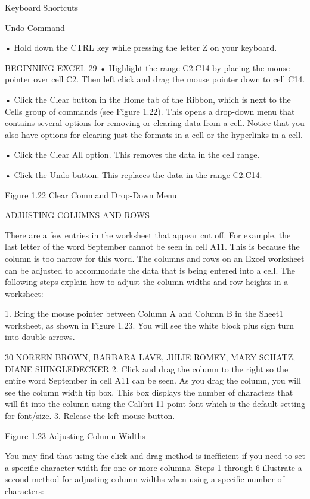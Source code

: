 Keyboard Shortcuts


Undo Command

• Hold down the CTRL key while pressing the letter Z on your keyboard.



BEGINNING EXCEL 29
• Highlight the range C2:C14 by placing the mouse pointer over cell C2. Then left click and drag the mouse
pointer down to cell C14.

• Click the Clear button in the Home tab of the Ribbon, which is next to the Cells group of commands
(see Figure 1.22). This opens a drop-down menu that contains several options for removing or clearing data
from a cell. Notice that you also have options for clearing just the formats in a cell or the hyperlinks in a cell.

• Click the Clear All option. This removes the data in the cell range.

• Click the Undo button. This replaces the data in the range C2:C14.




Figure 1.22 Clear Command Drop-Down Menu


ADJUSTING COLUMNS AND ROWS

There are a few entries in the worksheet that appear cut off. For example, the last letter of the
word September cannot be seen in cell A11. This is because the column is too narrow for this word.
The columns and rows on an Excel worksheet can be adjusted to accommodate the data that is being
entered into a cell. The following steps explain how to adjust the column widths and row heights in a
worksheet:

1. Bring the mouse pointer between Column A and Column B in the Sheet1 worksheet, as shown
in Figure 1.23. You will see the white block plus sign turn into double arrows.

30 NOREEN BROWN, BARBARA LAVE, JULIE ROMEY, MARY SCHATZ, DIANE SHINGLEDECKER
2. Click and drag the column to the right so the entire word September in cell A11 can be seen. As
you drag the column, you will see the column width tip box. This box displays the number of
characters that will fit into the column using the Calibri 11-point font which is the default
setting for font/size.
3. Release the left mouse button.




Figure 1.23 Adjusting Column Widths


You may find that using the click-and-drag method is inefficient if you need to set a specific character
width for one or more columns. Steps 1 through 6 illustrate a second method for adjusting column
widths when using a specific number of characters:

